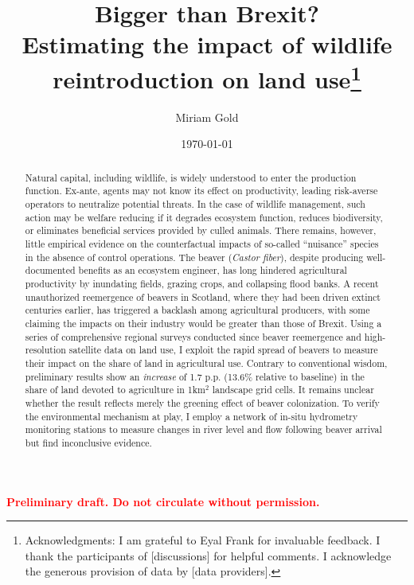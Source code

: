 \documentclass[11pt, english, letterpaper]{article}
\begin{document}
\justifying


\vspace{-2em} 

\title{Bigger than Brexit? \\ Estimating the impact of wildlife reintroduction on land use\thanks{Acknowledgments: I am grateful to Eyal Frank for invaluable feedback. I thank the participants of [discussions] for helpful comments. I acknowledge the generous provision of data by [data providers].}}

\author[1]{\small Miriam Gold}

\date{\today}
\maketitle

\begin{center}
\vspace{-3em}
\textbf{\textcolor{red}{Preliminary draft. Do not circulate without permission.}}
\end{center}

\begin{abstract}
    \singlespacing 
    Natural capital, including wildlife, is widely understood to enter the production function. Ex-ante, agents may not know its effect on productivity, leading risk-averse operators to neutralize potential threats. In the case of wildlife management, such action may be welfare reducing if it degrades ecosystem function, reduces biodiversity, or eliminates beneficial services provided by culled animals. There remains, however, little empirical evidence on the counterfactual impacts of so-called ``nuisance'' species in the absence of control operations. The beaver (\textit{Castor fiber}), despite producing well-documented benefits as an ecosystem engineer, has long hindered agricultural productivity by inundating fields, grazing crops, and collapsing flood banks. A recent unauthorized reemergence of beavers in Scotland, where they had been driven extinct centuries earlier, has triggered a backlash among agricultural producers, with some claiming the impacts on their industry would be greater than those of Brexit. Using a series of comprehensive regional surveys conducted since beaver reemergence and high-resolution satellite data on land use, I exploit the rapid spread of beavers to measure their impact on the share of land in agricultural use. Contrary to conventional wisdom, preliminary results show an \textit{increase} of 1.7 p.p. (13.6\% relative to baseline) in the share of land devoted to agriculture in 1km$^2$ landscape grid cells. It remains unclear whether the result reflects merely the greening effect of beaver colonization. To verify the environmental mechanism at play, I employ a network of in-situ hydrometry monitoring stations to measure changes in river level and flow following beaver arrival but find inconclusive evidence.
\end{abstract}
\end{document}
